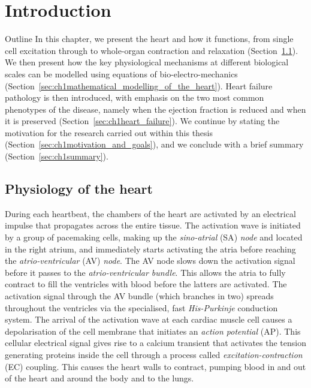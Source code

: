 \chapter{Introduction}\label{cha:chapter1}
%
%
%
\begin{remark}{Outline}
    In this chapter, we present the heart and how it functions, from single cell excitation through to whole-organ contraction and relaxation (Section~\ref{sec:ch1physiology_of_the_heart}). We then present how the key physiological mechanisms at different biological scales can be modelled using equations of bio-electro-mechanics (Section~\ref{sec:ch1mathematical_modelling_of_the_heart}). Heart failure pathology is then introduced, with emphasis on the two most common phenotypes of the disease, namely when the ejection fraction is reduced and when it is preserved (Section~\ref{sec:ch1heart_failure}). We continue by stating the motivation for the research carried out within this thesis (Section~\ref{sec:ch1motivation_and_goals}), and we conclude with a brief summary (Section~\ref{sec:ch1summary}).
\end{remark}


%
%
%
\section{Physiology of the heart}\label{sec:ch1physiology_of_the_heart}
During each heartbeat, the chambers of the heart are activated by an electrical impulse that propagates across the entire tissue. The activation wave is initiated by a group of pacemaking cells, making up the \textit{sino-atrial} (\acs{SA}) \textit{node} and located in the right atrium, and immediately starts activating the atria before reaching the \textit{atrio-ventricular} (\acs{AV}) \textit{node}. The AV node slows down the activation signal before it passes to the \textit{atrio-ventricular bundle}. This allows the atria to fully contract to fill the ventricles with blood before the latters are activated. The activation signal through the AV bundle (which branches in two) spreads throughout the ventricles via the specialised, fast \textit{His-Purkinje} conduction system. The arrival of the activation wave at each cardiac muscle cell causes a depolarisation of the cell membrane that initiates an \textit{action potential} (\acs{AP}). This cellular electrical signal gives rise to a calcium transient that activates the tension generating proteins inside the cell through a process called \textit{excitation-contraction} (\acs{EC}) coupling. This causes the heart walls to contract, pumping blood in and out of the heart and around the body and to the lungs.


